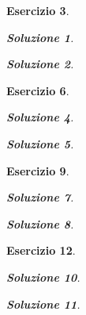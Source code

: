 \documentclass[a4paper]{article}
\theoremstyle{plain}
\newtheorem{ex}{Esercizio}
\newtheorem{sol}[ex]{Soluzione}
\begin{document}
\begin{ex}


\begin{sol}

\end{sol}

\begin{sol}

\end{sol}


\end{ex}

\begin{ex}


\begin{sol}

\end{sol}

\begin{sol}

\end{sol}


\end{ex}

\begin{ex}


\begin{sol}

\end{sol}

\begin{sol}

\end{sol}


\end{ex}

\begin{ex}


\begin{sol}

\end{sol}

\begin{sol}

\end{sol}


\end{ex}
\end{document}
